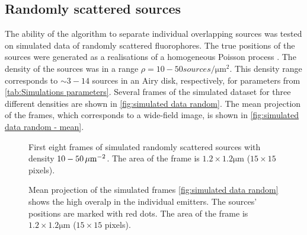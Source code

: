 
\subsection{Randomly scattered sources\label{sub:Simul random}}
The ability of the algorithm to separate individual overlapping sources was tested on simulated data of randomly scattered fluorophores. The true positions of the sources were generated as a realisations of a homogeneous Poisson process \cite{Ripley1977}. The density of the sources was in a range $\rho=10-50 \unit{sources/\um^2}$. This density range corresponds to $\sim 3-14$ sources in an Airy disk, respectively, for parameters from \autoref{tab:Simulations parameters}. Several frames of the simulated dataset for three different densities are shown in  \autoref{fig:simulated data random}. The mean projection of the frames, which corresponds to a wide-field image, is shown in \autoref{fig:simulated data random - mean}.
%
\begin{figure}[!htb]	
	\newcommand{\widthfig}{1\textwidth}
	\centering	
	
	
	\caption{First eight frames of simulated randomly scattered sources with density $10-50\, \mathrm{\mu m}^{-2}$. The area of the frame is $1.2\times1.2\unit{\um}$ ($15\times15$ pixels).}
	\label{fig:simulated data random}
\end{figure} 
%
\begin{figure}[!tb]	
	\newcommand{\widthfig}{.3\textwidth}
	\centering	
	\hspace{.3cm}	
	\hspace{.3cm}	
	\caption{Mean projection of the simulated frames \autoref{fig:simulated data random} shows the high overalp in the individual emitters. The sources' positions are marked with red dots. The area of the frame is $1.2\times1.2\unit{\um}$ ($15\times15$ pixels).}
	\label{fig:simulated data random - mean}
\end{figure} 

